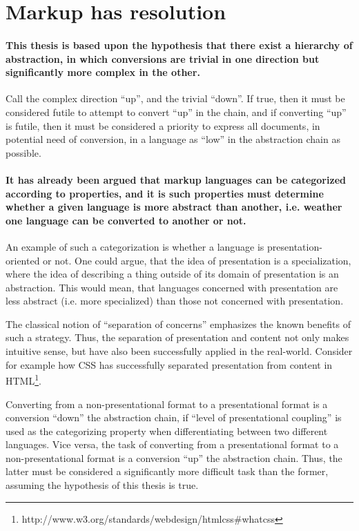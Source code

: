 \documentclass{scrreprt}
\begin{document}
\section{Markup has resolution}

\paragraph{This thesis is based upon the hypothesis that there exist a hierarchy of abstraction, in which conversions are trivial in one direction but significantly more complex in the other.} Call the complex direction ``up'', and the trivial ``down''. If true, then it must be considered futile to attempt to convert ``up'' in the chain, and if converting ``up'' is futile, then it must be considered a priority to express all documents, in potential need of conversion, in a language as ``low'' in the abstraction chain as possible. 

\paragraph{It has already been argued that markup languages can be categorized according to properties, and it is such properties must determine whether a given language is more abstract than another, i.e. weather one language can be converted to another or not.}
An example of such a categorization is whether a language is presentation-oriented or not. One could argue, that the idea of presentation is a specialization, where the idea of describing a thing outside of its domain of presentation is an abstraction. This would mean, that languages concerned with presentation are less abstract (i.e. more specialized) than those not concerned with presentation.

The classical notion of ``separation of concerns'' emphasizes the known benefits of such a strategy. Thus, the separation of presentation and content not only makes intuitive sense, but have also been successfully applied in the real-world. Consider for example how CSS has successfully separated presentation from content in HTML\footnote{http://www.w3.org/standards/webdesign/htmlcss\#whatcss}.

Converting from a non-presentational format to a presentational format is a conversion ``down'' the abstraction chain, if ``level of presentational coupling'' is used as the categorizing property when differentiating between two different languages. Vice versa, the task of converting from a presentational format to a non-presentational format is a conversion ``up'' the abstraction chain. Thus, the latter must be considered a significantly more difficult task than the former, assuming the hypothesis of this thesis is true.
\end{document}
